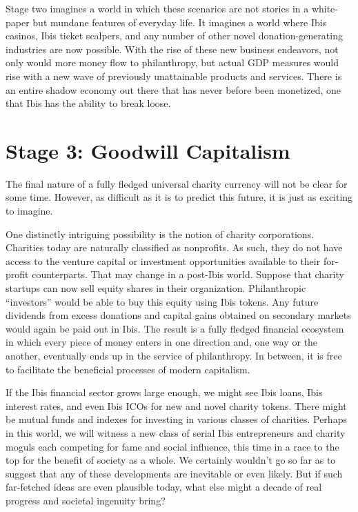 \documentclass{article} \usepackage{parskip} \usepackage{titlesec}
\begin{document}
Stage two imagines a world in which these scenarios are not stories in a
white-paper but mundane features of everyday life. It imagines a world where
Ibis casinos, Ibis ticket scalpers, and any number of other novel
donation-generating industries are now possible. With the rise of these new
business endeavors, not only would more money flow to philanthropy, but actual
GDP measures would rise with a new wave of previously unattainable products and
services. There is an entire shadow economy out there that has never before been
monetized, one that Ibis has the ability to break loose.

\section{Stage 3: Goodwill Capitalism}

The final nature of a fully fledged universal charity currency will not be clear
for some time. However, as difficult as it is to predict this future, it is just
as exciting to imagine.

One distinctly intriguing possibility is the notion of charity
corporations. Charities today are naturally classified as nonprofits. As such,
they do not have access to the venture capital or investment opportunities
available to their for-profit counterparts. That may change in a post-Ibis
world. Suppose that charity startups can now sell equity shares in their
organization. Philanthropic “investors” would be able to buy this equity using
Ibis tokens. Any future dividends from excess donations and capital gains
obtained on secondary markets would again be paid out in Ibis. The result is a
fully fledged financial ecosystem in which every piece of money enters in one
direction and, one way or the another, eventually ends up in the service of
philanthropy. In between, it is free to facilitate the beneficial processes of
modern capitalism.

If the Ibis financial sector grows large enough, we might see Ibis loans, Ibis
interest rates, and even Ibis ICOs for new and novel charity tokens. There might
be mutual funds and indexes for investing in various classes of
charities. Perhaps in this world, we will witness a new class of serial Ibis
entrepreneurs and charity moguls each competing for fame and social influence,
this time in a race to the top for the benefit of society as a whole. We
certainly wouldn’t go so far as to suggest that any of these developments are
inevitable or even likely. But if such far-fetched ideas are even plausible
today, what else might a decade of real progress and societal ingenuity bring?
\end{document}
